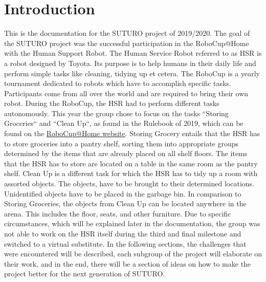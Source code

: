\documentclass[main.tex]{subfiles}
\begin{document}
	\chapter{Introduction}
	\label{introduction}
	
	This is the documentation for the SUTURO project of 2019/2020. The goal of the SUTURO project was the successful participation in the RoboCup@Home with the Human Support 	Robot. The Human Service Robot referred to as HSR is a robot designed by Toyota. Its purpose is to help humans in their daily life and perform simple tasks like cleaning, tidying up et cetera. The RoboCup is a yearly tournament dedicated to robots which have to accomplish specific tasks. Participants come from all over the world and are required to bring their own robot.
During the RoboCup, the HSR had to perform different tasks autonomously.
This year the group chose to focus on the tasks “Storing Groceries“ and “Clean Up“, as found in the Rulebook of 2019, which can be found on the \href{http://www.robocupathome.org/rules}{RoboCup@Home website}. 
	Storing Grocery entails that the HSR has to store groceries into a pantry shelf, sorting them into appropriate groups determined by the items that are already placed on all shelf floors. The items that the HSR has to store are located on a table in the same room as the pantry shelf.
Clean Up is a different task for which the HSR has to tidy up a room with assorted objects. The objects, have to be brought to their determined locations. Unidentified objects have to be placed in the garbage bin. In comparison to Storing Groceries, the objects from Clean Up can be located anywhere in the arena. This includes the floor, seats, and other furniture.
Due to specific circumstances, which will be explained later in the documentation, the group was not able to work on the HSR itself during the third and final milestone and switched to a virtual substitute.
	In the following sections, the challenges that were encountered will be described, each subgroup of the project will elaborate on their work, and in the end, there will be a section of ideas on how to make the project better for the next generation of SUTURO.
	
\end{document}

